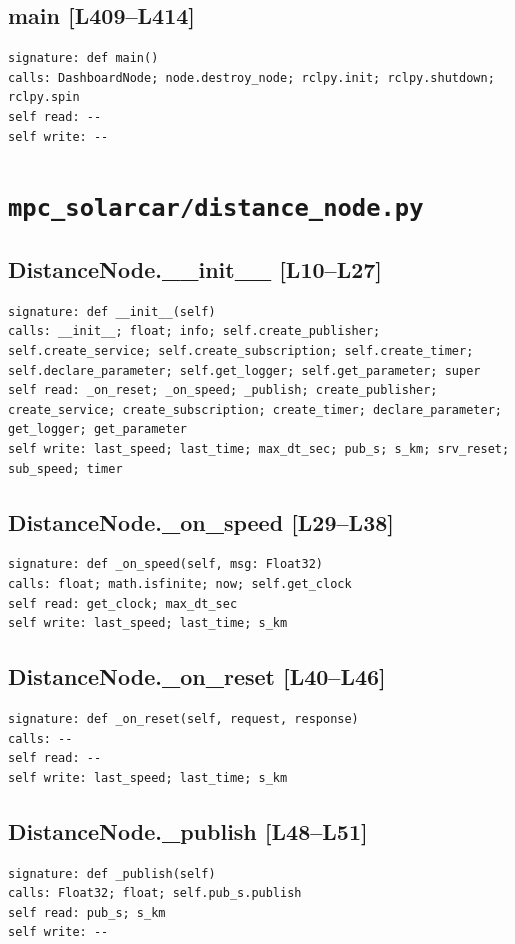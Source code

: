 \documentclass[a4paper,10pt,oneside]{book}
\begin{document}
\subsection*{main [L409--L414]}
\begin{lstlisting}[numbers=none]
signature: def main()
calls: DashboardNode; node.destroy_node; rclpy.init; rclpy.shutdown; rclpy.spin
self read: --
self write: --
\end{lstlisting}
\section{\texttt{mpc\_solarcar/distance\_node.py}}
\subsection*{DistanceNode.\_\_init\_\_ [L10--L27]}
\begin{lstlisting}[numbers=none]
signature: def __init__(self)
calls: __init__; float; info; self.create_publisher; self.create_service; self.create_subscription; self.create_timer; self.declare_parameter; self.get_logger; self.get_parameter; super
self read: _on_reset; _on_speed; _publish; create_publisher; create_service; create_subscription; create_timer; declare_parameter; get_logger; get_parameter
self write: last_speed; last_time; max_dt_sec; pub_s; s_km; srv_reset; sub_speed; timer
\end{lstlisting}
\subsection*{DistanceNode.\_on\_speed [L29--L38]}
\begin{lstlisting}[numbers=none]
signature: def _on_speed(self, msg: Float32)
calls: float; math.isfinite; now; self.get_clock
self read: get_clock; max_dt_sec
self write: last_speed; last_time; s_km
\end{lstlisting}
\subsection*{DistanceNode.\_on\_reset [L40--L46]}
\begin{lstlisting}[numbers=none]
signature: def _on_reset(self, request, response)
calls: --
self read: --
self write: last_speed; last_time; s_km
\end{lstlisting}
\subsection*{DistanceNode.\_publish [L48--L51]}
\begin{lstlisting}[numbers=none]
signature: def _publish(self)
calls: Float32; float; self.pub_s.publish
self read: pub_s; s_km
self write: --
\end{lstlisting}
\end{document}
